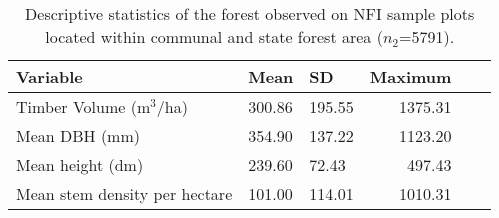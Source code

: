 
\begin{table}[ht]
	\begin{center}
	\caption{Descriptive statistics of the forest observed on NFI sample plots located within communal and state forest area ($n_2$=5791).}
	\label{tab:fieldata}
	{\small %
	\begin{tabular}{lllrrr}
		\hline
		Variable & Mean & SD & Maximum \\ 
		\hline \hline
Timber Volume (m$^3$/ha) & 300.86 & 195.55 & 1375.31 \\
Mean DBH (mm) & 354.90 & 137.22 & 1123.20 \\
Mean height (dm) & 239.60 & 72.43 & 497.43 \\
Mean stem density per hectare & 101.00  & 114.01 & 1010.31 \\
\hline
\hline
\end{tabular}
}%
\end{center}
\end{table}

